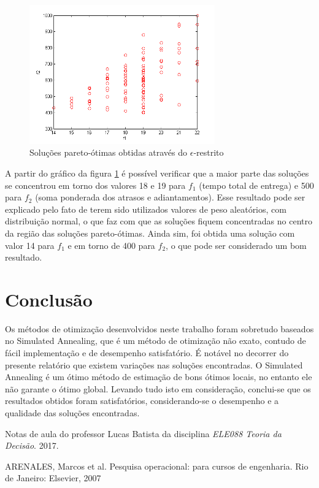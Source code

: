 \documentclass[conference]{IEEEtran}
\begin{document}
\begin{figure}[h]
	\centering
	\includegraphics[width=8cm]{img/result-e.png}
	\caption{Soluções pareto-ótimas obtidas através do $\epsilon$-restrito}
	\label{fig:result-e}
\end{figure}

A partir do gráfico da figura \ref{fig:result-e} é possível verificar que a maior parte das soluções se concentrou em torno dos valores 18 e 19 para $f_1$ (tempo total de entrega) e 500 para $f_2$ (soma ponderada dos atrasos e adiantamentos). Esse resultado pode ser explicado pelo fato de terem sido utilizados valores de peso aleatórios, com distribuição normal, o que faz com que as soluções fiquem concentradas no centro da região das soluções pareto-ótimas. Ainda sim, foi obtida uma solução com valor 14 para $f_1$ e em torno de 400 para $f_2$, o que pode ser considerado um bom resultado.	

\section{Conclusão}
Os métodos de otimização desenvolvidos neste trabalho foram sobretudo baseados no Simulated Annealing, que é um método de otimização não exato, contudo de fácil implementação e de desempenho satisfatório. É notável no decorrer do presente relatório que existem variações nas soluções encontradas. O Simulated Annealing é um ótimo método de estimação
de bons ótimos locais, no entanto ele não garante o ótimo global. Levando tudo isto em consideração, conclui-se que os resultados obtidos foram satisfatórios, considerando-se o desempenho e a qualidade das soluções encontradas.

\begin{thebibliography}{1}

Notas de aula do professor Lucas Batista da disciplina \emph{ELE088 Teoria da Decisão}. 2017.

ARENALES, Marcos et al. Pesquisa operacional: para cursos de engenharia. Rio de Janeiro: Elsevier, 2007

\end{thebibliography}


\end{document}
